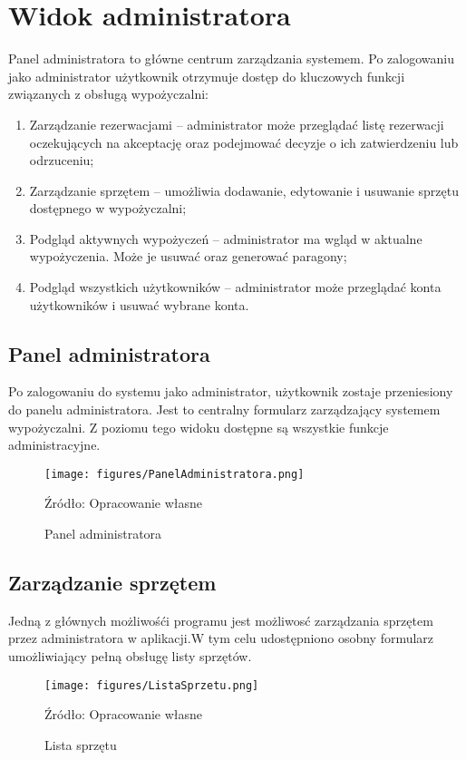 \section{Widok administratora}
Panel administratora to główne centrum zarządzania systemem. Po zalogowaniu jako administrator użytkownik otrzymuje dostęp do kluczowych funkcji związanych z obsługą wypożyczalni:
\begin{enumerate}
    \item Zarządzanie rezerwacjami – administrator może przeglądać listę rezerwacji oczekujących na akceptację oraz podejmować decyzje o ich zatwierdzeniu lub odrzuceniu;
    \item Zarządzanie sprzętem – umożliwia dodawanie, edytowanie i usuwanie sprzętu dostępnego w wypożyczalni;
    \item Podgląd aktywnych wypożyczeń – administrator ma wgląd w aktualne wypożyczenia. Może je usuwać oraz generować paragony;
    \item Podgląd wszystkich użytkowników – administrator może przeglądać konta użytkowników i usuwać wybrane konta.
\end{enumerate}

\subsection{Panel administratora}
Po zalogowaniu do systemu jako administrator, użytkownik zostaje przeniesiony do panelu administratora. Jest to centralny formularz zarządzający systemem wypożyczalni. Z poziomu tego widoku dostępne są wszystkie funkcje administracyjne.
\vspace{-0.2cm}
\begin{figure}[!htbp]
    \centering
    \texttt{[image: figures/PanelAdministratora.png]}
    \caption{Panel administratora}
    \label{fig:panel_edycji_danych}
    \small{Źródło: Opracowanie własne}
\end{figure}
\clearpage

\subsection{Zarządzanie sprzętem}
Jedną z głównych możliwośći programu jest możliwosć zarządzania sprzętem przez administratora w aplikacji.W tym celu udostępniono osobny formularz umożliwiający pełną obsługę listy sprzętów. 
\vspace{-0.2cm}
\begin{figure}[!htbp]
    \centering
    \texttt{[image: figures/ListaSprzetu.png]}
    \caption{Lista sprzętu}
    \label{fig:listaSprzetu}
    \small{Źródło: Opracowanie własne}
\end{figure}

